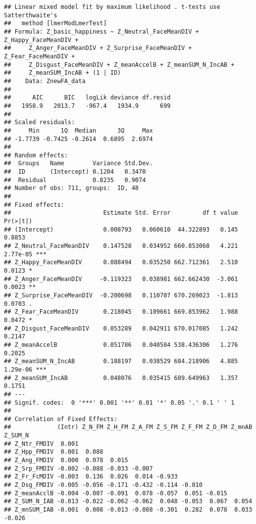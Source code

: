 \documentclass[
]{article}
\begin{document}
\begin{verbatim}
## Linear mixed model fit by maximum likelihood . t-tests use Satterthwaite's
##   method [lmerModLmerTest]
## Formula: Z_basic_happiness ~ Z_Neutral_FaceMeanDIV + Z_Happy_FaceMeanDIV +  
##     Z_Anger_FaceMeanDIV + Z_Surprise_FaceMeanDIV + Z_Fear_FaceMeanDIV +  
##     Z_Disgust_FaceMeanDIV + Z_meanAccelB + Z_meanSUM_N_IncAB +  
##     Z_meanSUM_IncAB + (1 | ID)
##    Data: ZnewFA_data
## 
##      AIC      BIC   logLik deviance df.resid 
##   1958.9   2013.7   -967.4   1934.9      699 
## 
## Scaled residuals: 
##     Min      1Q  Median      3Q     Max 
## -1.7739 -0.7425 -0.2614  0.6895  2.6974 
## 
## Random effects:
##  Groups   Name        Variance Std.Dev.
##  ID       (Intercept) 0.1204   0.3470  
##  Residual             0.8235   0.9074  
## Number of obs: 711, groups:  ID, 48
## 
## Fixed effects:
##                          Estimate Std. Error         df t value Pr(>|t|)    
## (Intercept)              0.008793   0.060610  44.322893   0.145   0.8853    
## Z_Neutral_FaceMeanDIV    0.147528   0.034952 660.853068   4.221 2.77e-05 ***
## Z_Happy_FaceMeanDIV      0.088494   0.035250 662.712361   2.510   0.0123 *  
## Z_Anger_FaceMeanDIV     -0.119323   0.038981 662.662430  -3.061   0.0023 ** 
## Z_Surprise_FaceMeanDIV  -0.200698   0.110707 670.269023  -1.813   0.0703 .  
## Z_Fear_FaceMeanDIV       0.218045   0.109661 669.853962   1.988   0.0472 *  
## Z_Disgust_FaceMeanDIV    0.053289   0.042911 670.017085   1.242   0.2147    
## Z_meanAccelB             0.051786   0.040584 538.436306   1.276   0.2025    
## Z_meanSUM_N_IncAB        0.188197   0.038529 684.218906   4.885 1.29e-06 ***
## Z_meanSUM_IncAB          0.048076   0.035415 689.649963   1.357   0.1751    
## ---
## Signif. codes:  0 '***' 0.001 '**' 0.01 '*' 0.05 '.' 0.1 ' ' 1
## 
## Correlation of Fixed Effects:
##             (Intr) Z_N_FM Z_H_FM Z_A_FM Z_S_FM Z_F_FM Z_D_FM Z_mnAB Z_SUM_N
## Z_Ntr_FMDIV  0.001                                                         
## Z_Hpp_FMDIV  0.001  0.088                                                  
## Z_Ang_FMDIV  0.000  0.078  0.015                                           
## Z_Srp_FMDIV -0.002 -0.088 -0.033 -0.007                                    
## Z_Fr_FcMDIV -0.003  0.136  0.026  0.014 -0.933                             
## Z_Dsg_FMDIV -0.005 -0.056 -0.171 -0.432 -0.114 -0.010                      
## Z_meanAcclB -0.004 -0.007 -0.091  0.078 -0.057  0.051 -0.015               
## Z_SUM_N_IAB -0.013 -0.022 -0.062 -0.062  0.048 -0.053  0.067  0.054        
## Z_mnSUM_IAB -0.001  0.008 -0.013 -0.088 -0.301  0.282  0.078  0.033 -0.026
\end{verbatim}
\end{document}
